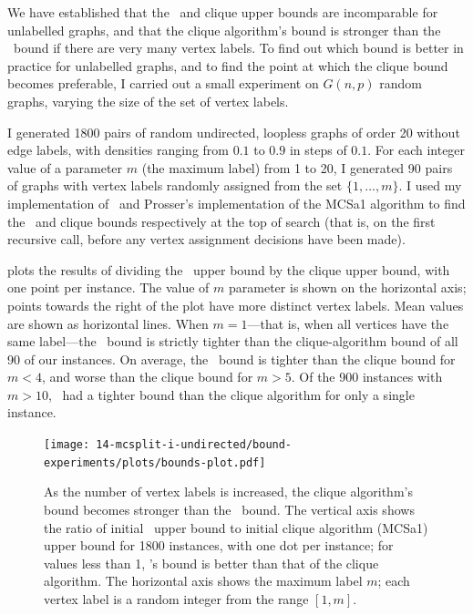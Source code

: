 We have established that the \McSplit\ and clique upper bounds are incomparable for unlabelled graphs,
and that the clique algorithm's bound is stronger than the \McSplit\ bound if there are very many vertex
labels.  To find out which bound is better in practice for unlabelled graphs, and to find the point
at which the clique bound becomes preferable, I carried out a small experiment on $G(n,p)$ random graphs,
varying the size of the set of vertex labels.

I generated 1800 pairs of random undirected, loopless graphs of order 20 without edge labels,
with densities ranging from $0.1$ to $0.9$
in steps of $0.1$.  For each integer value of a parameter $m$ (the maximum label) from 1 to 20, I generated
90 pairs of graphs with vertex labels randomly assigned from the set $\{1,\dots,m\}$.  I used my
implementation of \McSplit\ and Prosser's implementation of the MCSa1 algorithm
\cite{DBLP:journals/algorithms/Prosser12} to find the \McSplit\ and clique bounds respectively
at the top of search (that is, on the first recursive call, before any vertex assignment decisions
have been made).

 plots the results of dividing the \McSplit\ upper bound by the
clique upper bound, with one point per instance.  The value of $m$ parameter is shown on the horizontal
axis; points towards the right of the plot have more distinct vertex labels.  Mean values
are shown as horizontal lines.  When $m=1$---that is,
when all vertices have the same label---the \McSplit\ bound is strictly tighter than the clique-algorithm
bound of all 90 of our instances.  On average, the \McSplit\ bound is tighter than the clique
bound for $m < 4$, and worse than the clique bound for $m > 5$.  Of the 900 instances with $m > 10$,
\McSplit\ had a tighter bound than the clique algorithm for only a single instance.

\begin{figure}[htb]
    \centering
    \texttt{[image: 14-mcsplit-i-undirected/bound-experiments/plots/bounds-plot.pdf]}
    \caption{As the number of vertex labels is increased, the clique algorithm's bound
    	becomes stronger than the \McSplit\ bound.
        The vertical axis shows the ratio of initial \McSplit\ upper bound
	to initial clique algorithm (MCSa1) upper bound for 1800 instances, with one dot per instance;
	for values less than 1, \McSplit's bound is better than that of the clique algorithm.
	The horizontal axis shows the maximum label $m$; each vertex label is a random integer 
	from the range $[1,m]$.}
    \label{figure:bound-ratio}
\end{figure}

